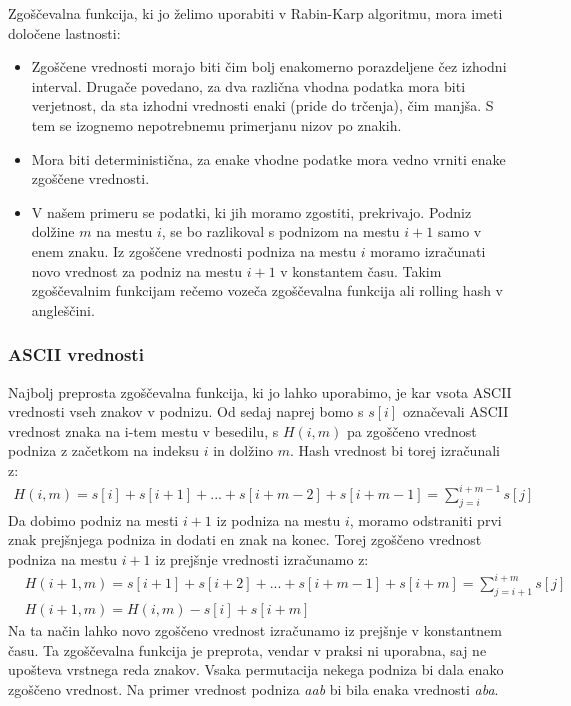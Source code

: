 \documentclass[12pt]{article}
\begin{document}
Zgoščevalna funkcija, ki jo želimo uporabiti v Rabin-Karp algoritmu, mora imeti določene lastnosti:
\begin{itemize}
  \item Zgoščene vrednosti morajo biti čim bolj enakomerno porazdeljene čez izhodni interval. Drugače povedano, za dva različna vhodna podatka mora
  biti verjetnost, da sta izhodni vrednosti enaki (pride do trčenja), čim manjša. S tem se izognemo nepotrebnemu primerjanu nizov po znakih.
  \item Mora biti deterministična, za enake vhodne podatke mora vedno vrniti enake zgoščene vrednosti.
  \item V našem primeru se podatki, ki jih moramo zgostiti, prekrivajo. Podniz dolžine $m$ na mestu $i$, se bo razlikoval s podnizom
  na mestu $i+1$ samo v enem znaku. Iz zgoščene vrednosti podniza na mestu $i$ moramo izračunati novo vrednost za podniz na mestu $i+1$ v 
  konstantem času. Takim zgoščevalnim funkcijam rečemo vozeča zgoščevalna funkcija ali rolling hash v angleščini.
\end{itemize}

\subsubsection{ASCII vrednosti}
Najbolj preprosta zgoščevalna funkcija, ki jo lahko uporabimo, je kar vsota ASCII vrednosti vseh znakov v podnizu. Od sedaj naprej bomo s $s[i]$ označevali
ASCII vrednost znaka na i-tem mestu v besedilu, s $H(i, m)$ pa zgoščeno vrednost podniza z začetkom na indeksu $i$ in dolžino $m$. Hash vrednost bi torej izračunali
z:
\begin{align*} 
  H(i, m) = s[i] + s[i+1] + ... + s[i+m-2] + s[i+m-1] = \sum_{j=i}^{i+m-1} s[j]
\end{align*}
Da dobimo podniz na mesti $i+1$ iz podniza na mestu $i$, moramo odstraniti prvi znak prejšnjega podniza in dodati en znak na konec.
Torej zgoščeno vrednost podniza na mestu $i+1$ iz prejšnje vrednosti izračunamo z:
\begin{align*} 
  &H(i+1, m) = s[i+1] + s[i+2] + ... + s[i+m-1] + s[i+m] = \sum_{j=i+1}^{i+m} s[j] \\
  &H(i+1, m) =  H(i, m) - s[i] + s[i+m]
\end{align*}
Na ta način lahko novo zgoščeno vrednost izračunamo iz prejšnje v konstantnem času.
Ta zgoščevalna funkcija je preprota, vendar v praksi ni uporabna, saj ne upošteva vrstnega reda znakov. Vsaka permutacija nekega podniza bi dala
enako zgoščeno vrednost. Na primer vrednost podniza \textit{aab} bi bila enaka vrednosti \textit{aba}.
\end{document}
